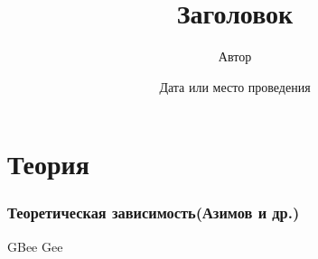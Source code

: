 \documentclass[utf8]{beamer}
\title{Заголовок}
\date{Дата или место проведения}
\author{Автор}
\begin{document}
    \begin{frame}
        \titlepage
    \end{frame}
    \section{Теория}
    \begin{frame}
        \frametitle{Теоретическая зависимость(Азимов и др.)}
        \alert{GBee}
        \pause
        \alert{Gee}
    \end{frame}
\end{document}
